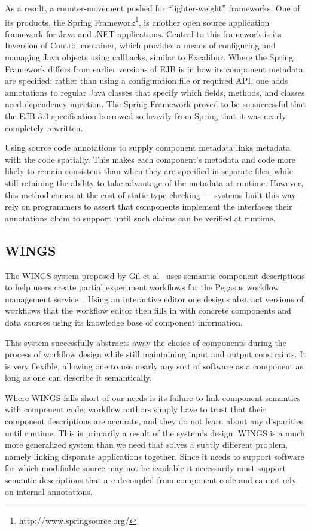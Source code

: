 \documentclass{article}
\begin{document}
As a result, a counter-movement pushed for ``lighter-weight'' frameworks.
One of its products, the Spring Framework\footnote{http://www.springsource.org/}, is another open source application framework for Java and .NET applications.
Central to this framework is its Inversion of Control container, which provides a means of configuring and managing Java objects using callbacks, similar to Excalibur.
Where the Spring Framework differs from earlier versions of EJB is in how its component metadata are specified:  rather than using a configuration file or required API, one adds annotations to regular Java classes that specify which fields, methods, and classes need dependency injection.
The Spring Framework proved to be so successful that the EJB 3.0 specification borrowed so heavily from Spring that it was nearly completely rewritten.

Using source code annotations to supply component metadata links metadata with the code spatially.
This makes each component's metadata and code more likely to remain consistent than when they are specified in separate files, while still retaining the ability to take advantage of the metadata at runtime.
However, this method comes at the cost of static type checking --- systems built this way rely on programmers to assert that components implement the interfaces their annotations claim to support until such claims can be verified at runtime.

\subsection{WINGS}

The WINGS system proposed by Gil et al~\cite{gil2007wings} uses semantic component descriptions to help users create partial experiment workflows for the Pegasus workflow management service~\cite{callaghan2009scaling}.
Using an interactive editor one designs abstract versions of workflows that the workflow editor then fills in with concrete components and data sources using its knowledge base of component information.

This system successfully abstracts away the choice of components during the process of workflow design while still maintaining input and output constraints.
It is very flexible, allowing one to use nearly any sort of software as a component as long as one can describe it semantically.

Where WINGS falls short of our needs is its failure to link component semantics with component code; workflow authors simply have to trust that their component descriptions are accurate, and they do not learn about any disparities until runtime.
This is primarily a result of the system's design.
WINGS is a much more generalized system than we need that solves a subtly different problem, namely linking disparate applications together.
Since it needs to support software for which modifiable source may not be available it necessarily must support semantic descriptions that are decoupled from component code and cannot rely on internal annotations.
\end{document}

